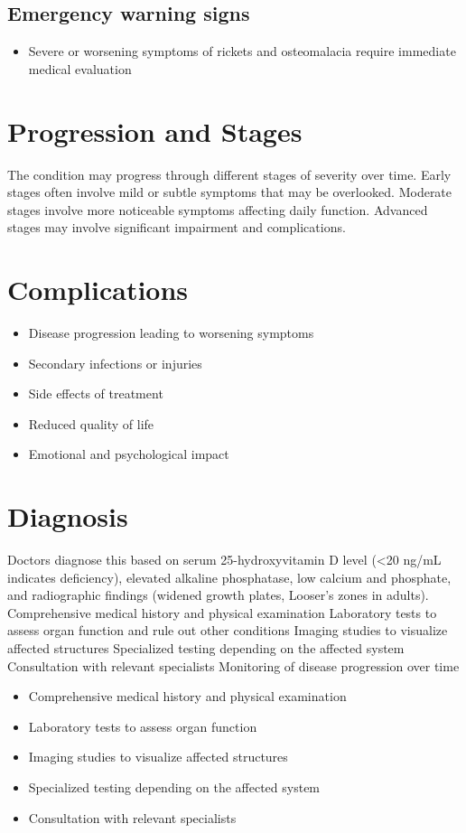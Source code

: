 \subsection{Emergency warning signs}
\begin{itemize}[noitemsep]
  \item Severe or worsening symptoms of rickets and osteomalacia require immediate medical evaluation
\end{itemize}
\section{Progression and Stages}
The condition may progress through different stages of severity over time. Early stages often involve mild or subtle symptoms that may be overlooked. Moderate stages involve more noticeable symptoms affecting daily function. Advanced stages may involve significant impairment and complications.
\section{Complications}
\begin{itemize}[noitemsep]
  \item Disease progression leading to worsening symptoms
  \item Secondary infections or injuries
  \item Side effects of treatment
  \item Reduced quality of life
  \item Emotional and psychological impact
\end{itemize}
\section{Diagnosis}
Doctors diagnose this based on serum 25-hydroxyvitamin D level (<20 ng/mL indicates deficiency), elevated alkaline phosphatase, low calcium and phosphate, and radiographic findings (widened growth plates, Looser's zones in adults). Comprehensive medical history and physical examination Laboratory tests to assess organ function and rule out other conditions Imaging studies to visualize affected structures Specialized testing depending on the affected system Consultation with relevant specialists Monitoring of disease progression over time

\begin{itemize}[noitemsep]
  \item Comprehensive medical history and physical examination
  \item Laboratory tests to assess organ function
  \item Imaging studies to visualize affected structures
  \item Specialized testing depending on the affected system
  \item Consultation with relevant specialists
\end{itemize}
